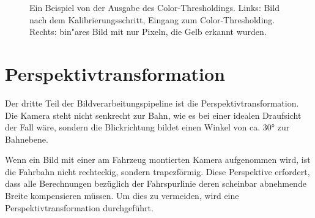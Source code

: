 \documentclass[arbeit=studie,oneside,BCOR=12mm]{ArbeitRST}
\begin{document}
\begin{figure}[h]
    \centering
    \caption{Ein Beispiel von der Ausgabe des Color-Thresholdings. Links: Bild
    nach dem Kalibrierungsschritt, Eingang zum \glqq Color-Thresholding\grqq.
    Rechts: bin"ares Bild mit nur Pixeln, die Gelb erkannt wurden.}
    \label{color-thresholding}
\end{figure}

\section{Perspektivtransformation}

Der dritte Teil der Bildverarbeitungspipeline ist die Perspektivtransformation. 
Die Kamera steht nicht senkrecht zur Bahn, wie es bei einer idealen
Draufsicht der Fall wäre, sondern die Blickrichtung bildet einen Winkel von ca.
30° zur Bahnebene.

Wenn ein Bild mit einer am Fahrzeug montierten Kamera aufgenommen wird, ist die
Fahrbahn nicht rechteckig, sondern trapezförmig. Diese Perspektive
erfordert, dass alle Berechnungen bezüglich der Fahrspurlinie deren scheinbar abnehmende
Breite kompensieren müssen. Um dies zu vermeiden, wird eine
Perspektivtransformation durchgeführt. 
\end{document}
